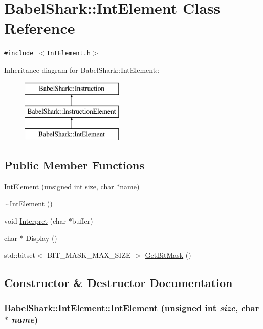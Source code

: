 \hypertarget{class_babel_shark_1_1_int_element}{
\section{BabelShark::IntElement Class Reference}
\label{class_babel_shark_1_1_int_element}
}
{\tt \#include $<$IntElement.h$>$}

Inheritance diagram for BabelShark::IntElement::\begin{figure}[H]
\begin{center}
\leavevmode
\includegraphics[height=3cm]{class_babel_shark_1_1_int_element}
\end{center}
\end{figure}
\subsection*{Public Member Functions}
\begin{CompactItemize}
\item 
\hyperlink{class_babel_shark_1_1_int_element_7deb3e3749bf27dfd15ab0862caea306}{IntElement} (unsigned int size, char $\ast$name)
\item 
\hyperlink{class_babel_shark_1_1_int_element_51241ef34578ac87e4b124628a4929ff}{$\sim$IntElement} ()
\item 
void \hyperlink{class_babel_shark_1_1_int_element_d8467ad7b321f4189f944833ee60990f}{Interpret} (char $\ast$buffer)
\item 
char $\ast$ \hyperlink{class_babel_shark_1_1_int_element_c6999927ab0af83714479752fda88f9b}{Display} ()
\item 
std::bitset$<$ BIT\_\-MASK\_\-MAX\_\-SIZE $>$ \hyperlink{class_babel_shark_1_1_int_element_e91b02a2a8e83f55556d6756c12bf1b5}{GetBitMask} ()
\end{CompactItemize}


\subsection{Constructor \& Destructor Documentation}
\hypertarget{class_babel_shark_1_1_int_element_7deb3e3749bf27dfd15ab0862caea306}{
\subsubsection[{IntElement}]{\setlength{\rightskip}{0pt plus 5cm}BabelShark::IntElement::IntElement (unsigned int {\em size}, \/  char $\ast$ {\em name})}}
\label{class_babel_shark_1_1_int_element_7deb3e3749bf27dfd15ab0862caea306}


